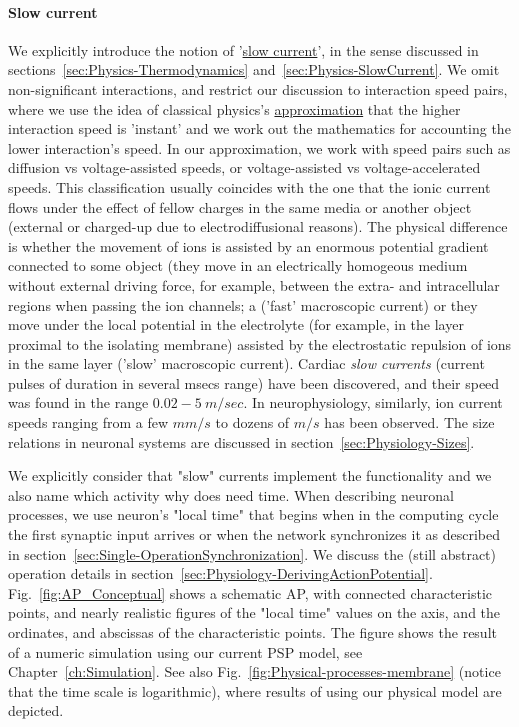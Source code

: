 \paragraph{Slow current\label{sec:Single-SlowCurrent}}
We explicitly introduce the notion of '\hyperlink{slow_current}{slow current}',
in the sense discussed in sections~\ref{sec:Physics-Thermodynamics} and~\ref{sec:Physics-SlowCurrent}.
We omit non-significant interactions, and restrict our discussion
to interaction speed pairs, where we use the idea of classical physics's \hyperlink{Abstractions}
{approximation}
that the higher interaction speed is 'instant'
and we work out the mathematics for accounting the lower interaction's speed.
In our approximation, we work with speed pairs such as diffusion vs voltage-assisted speeds, or voltage-assisted vs voltage-accelerated speeds.
This classification usually coincides with the one that the ionic current flows under the effect of fellow charges in the same media or another object (external or charged-up due to electrodiffusional reasons).
The physical difference is whether the movement of ions is assisted
by an enormous potential gradient connected to some object (they move in
an electrically homogeous medium without external driving force, for example, between the extra- and intracellular regions
when passing the ion channels; a ('fast' macroscopic current)
or they move under the local potential in the electrolyte (for example, in the layer proximal to the isolating membrane)
assisted by the electrostatic repulsion of ions in the same layer
('slow' macroscopic current).
Cardiac \textit{slow currents} (current pulses of duration in several msecs range) \cite{ SlowCurrentChannels:1985}  have been discovered,
and their speed \cite{CardiacAPS:1980} was found in the range $0.02-5\ m/sec$.
In neurophysiology, similarly, ion current speeds
ranging from a few $mm/s$ to dozens of $m/s$ has been observed.
The size relations in neuronal systems are discussed in section~\ref{sec:Physiology-Sizes}.

We explicitly consider that "slow" currents implement the
functionality and we also name which activity why does need time.
When describing neuronal processes, we use neuron's "local time"
that begins when in the computing cycle the first synaptic input arrives or when the network synchronizes it as described in section~\ref{sec:Single-OperationSynchronization}.
We discuss the (still abstract) operation details in section~\ref{sec:Physiology-DerivingActionPotential}.
Fig.~\ref{fig:AP_Conceptual} shows a schematic \gls{AP}, with connected 
characteristic points, and nearly realistic figures of the "local time" values on the axis,
and the ordinates, and abscissas of the characteristic points.
The figure shows the result of a numeric simulation using our current \gls{PSP}
model, see Chapter~\ref{ch:Simulation}.
See also Fig.~\ref{fig:Physical-processes-membrane} (notice that the
time scale is logarithmic), where results of using our physical model are depicted. 

